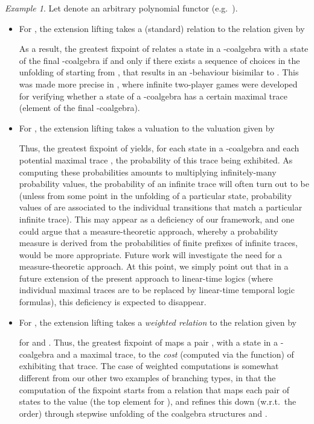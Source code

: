 \documentclass[submission,copyright,creativecommons]{eptcs}
\theoremstyle{plain}\newtheorem{theorem}{Theorem}[section]
\theoremstyle{remark}
\newtheorem{example}[remark]{Example}
\begin{document}
\begin{example}
Let  denote an arbitrary polynomial functor (e.g.~).
\begin{itemize}
\item For , the extension lifting  takes a (standard) relation  to the relation  given by

As a result, the greatest fixpoint of  relates a state  in a -coalgebra  with a state  of the final -coalgebra if and only if there exists a sequence of choices in the unfolding of  starting from , that results in an -behaviour bisimilar to . This was made more precise in \cite{cirstea-11}, where infinite two-player games were developed for verifying whether a state of a -coalgebra has a certain maximal trace (element of the final -coalgebra).
\item For , the extension lifting  takes a valuation  to the valuation  given by

Thus, the greatest fixpoint of  yields, for each state in a -coalgebra and each potential maximal trace , the probability of this trace being exhibited. As computing these probabilities amounts to multiplying infinitely-many probability values, the probability of an infinite trace will often turn out to be  (unless from some point in the unfolding of a particular state, probability values of  are associated to the individual transitions that match a particular infinite trace). This may appear as a deficiency of our framework, and one could argue that a measure-theoretic approach, whereby a probability measure is derived from the probabilities of finite prefixes of infinite traces, would be more appropriate. Future work will investigate the need for a measure-theoretic approach. At this point, we simply point out that in a future extension of the present approach to linear-time logics (where individual maximal traces are to be replaced by linear-time temporal logic formulas), this deficiency is expected to disappear.
\item For , the extension lifting  takes a \emph{weighted relation}  to the relation  given by

for  and . Thus, the greatest fixpoint of  maps a pair , with  a state in a -coalgebra and  a maximal trace, to the \emph{cost} (computed via the  function) of exhibiting that trace. The case of weighted computations is somewhat different from our other two examples of branching types, in that the computation of the fixpoint starts from a relation that maps each pair of states  to the value  (the top element for ), and refines this down (w.r.t.~the  order) through stepwise unfolding of the coalgebra structures  and .
\end{itemize}
\end{example}
\end{document}
